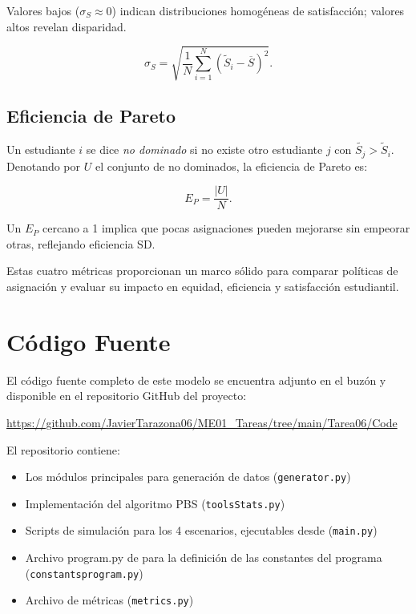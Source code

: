 \documentclass{article}
\begin{document}
Valores bajos ($\sigma_S \approx0$) indican distribuciones homogéneas de satisfacción; valores altos revelan disparidad.

$$
\sigma_S = \sqrt{ \frac{1}{N} \sum_{i=1}^N (\widetilde S_i - \overline S)^2 }.
$$

\subsection{Eficiencia de Pareto}
Un estudiante $i$ se dice \emph{no dominado} si no existe otro estudiante 
$j$ con $\widetilde{S_j} > \widetilde S_i$. Denotando por $U$ el
 conjunto de no dominados, la eficiencia de Pareto es:

$$
E_P = \frac{|U|}{N}.
$$

Un $E_P$ cercano a 1 implica que pocas asignaciones pueden mejorarse sin empeorar otras, reflejando eficiencia SD.

Estas cuatro métricas proporcionan un marco sólido para comparar políticas de asignación y evaluar su impacto en equidad, eficiencia y satisfacción estudiantil.



\section{Código Fuente}\label{sec:cod}

El código fuente completo de este modelo se encuentra adjunto en el buzón y disponible en el repositorio GitHub del proyecto:

\begin{center}
\url{https://github.com/JavierTarazona06/ME01_Tareas/tree/main/Tarea06/Code}
\end{center}

El repositorio contiene:
\begin{itemize}
\item Los módulos principales para generación de datos (\texttt{generator.py})
\item Implementación del algoritmo PBS (\texttt{toolsStats.py})
\item Scripts de simulación para los 4 escenarios, ejecutables desde (\texttt{main.py})
\item Archivo program.py de para la definición de las constantes del programa (\texttt{constants\/program.py})
\item Archivo de métricas (\texttt{metrics.py})
\end{itemize}
\end{document}
